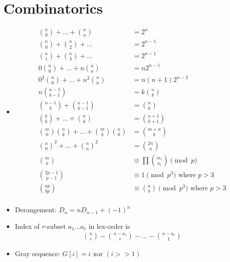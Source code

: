 \documentclass{article}
\begin{document}
\section{Combinatorics}
\begin{itemize}

\item
\begin{align*}
	\binom{n}{0} + \hdots + \binom{n}{n} &= 2^n \\
	\binom{n}{0} + \binom{n}{2} + \hdots &= 2^{n-1} \\
	\binom{n}{1} + \binom{n}{3} + \hdots &= 2^{n-1} \\
	0 \binom{n}{0} + \hdots + n \binom{n}{n} &= n 2^{n-1} \\
	0^2 \binom{n}{0} + \hdots + n^2 \binom{n}{n} &= n (n+1) 2^{n-2} \\
	n \binom{n-1}{k-1} &= k \binom{n}{k} \\
	\binom{n-1}{k} + \binom{n-1}{k-1} &= \binom{n}{k} \\
	\binom{k}{k} + \hdots + \binom{n}{k} &= \binom{n+1}{k+1} \\
	\binom{m}{0} \binom{n}{k} + \hdots + \binom{m}{k} \binom{n}{0} &= \binom{m+n}{k} \\
	\binom{n}{0}^2 + \hdots + \binom{n}{n}^2 &= \binom{2n}{n} \\
	\binom{m}{n} &\equiv \prod{\binom{m_i}{n_i}} \pmod{p} \\ %
	\binom{2p-1}{p-1} &\equiv 1 \pmod{p^3} \text{ where } p > 3 \\ %
	\binom{ap}{bp} &\equiv \binom{a}{b} \pmod{p^3} \text{ where } p > 3 \\ %
\end{align*}

\item Derangement: $D_n = n D_{n-1} + (-1)^n$

\item Index of $r$-subset $a_1 \hdots a_r$ in lex-order is
\begin{align*}
	\binom{n}{r} - \binom{n-a_1}{r} - \hdots - \binom{n-a_r}{1}
\end{align*}

\item Gray sequence: $G[i] = i \text{ xor } (i >> 1)$


\end{itemize}
\end{document}
